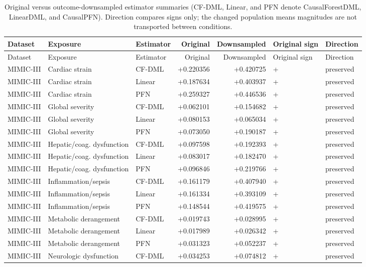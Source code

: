 \begin{longtable}{@{}p{0.78in}p{1.18in}p{0.56in}rrlp{0.62in}@{}}
\caption{Original versus outcome-downsampled estimator summaries (CF-DML, Linear, and PFN denote CausalForestDML, LinearDML, and CausalPFN). Direction compares signs only; the changed population means magnitudes are not transported between conditions.}\label{tab:supp-downsampling}\\
\toprule Dataset & Exposure & Estimator & Original & Downsampled & Original sign & Direction\\
\midrule \endfirsthead
\toprule Dataset & Exposure & Estimator & Original & Downsampled & Original sign & Direction\\
\midrule \endhead
MIMIC-III & Cardiac strain & CF-DML & +0.220356 & +0.420725 & + & preserved\\
MIMIC-III & Cardiac strain & Linear & +0.187634 & +0.403937 & + & preserved\\
MIMIC-III & Cardiac strain & PFN & +0.259327 & +0.446536 & + & preserved\\
MIMIC-III & Global severity & CF-DML & +0.062101 & +0.154682 & + & preserved\\
MIMIC-III & Global severity & Linear & +0.080153 & +0.065034 & + & preserved\\
MIMIC-III & Global severity & PFN & +0.073050 & +0.190187 & + & preserved\\
MIMIC-III & Hepatic/coag. dysfunction & CF-DML & +0.097598 & +0.192393 & + & preserved\\
MIMIC-III & Hepatic/coag. dysfunction & Linear & +0.083017 & +0.182470 & + & preserved\\
MIMIC-III & Hepatic/coag. dysfunction & PFN & +0.096846 & +0.219766 & + & preserved\\
MIMIC-III & Inflammation/sepsis & CF-DML & +0.161179 & +0.407940 & + & preserved\\
MIMIC-III & Inflammation/sepsis & Linear & +0.161334 & +0.393109 & + & preserved\\
MIMIC-III & Inflammation/sepsis & PFN & +0.148544 & +0.419575 & + & preserved\\
MIMIC-III & Metabolic derangement & CF-DML & +0.019743 & +0.028995 & + & preserved\\
MIMIC-III & Metabolic derangement & Linear & +0.017989 & +0.026342 & + & preserved\\
MIMIC-III & Metabolic derangement & PFN & +0.031323 & +0.052237 & + & preserved\\
MIMIC-III & Neurologic dysfunction & CF-DML & +0.034253 & +0.074812 & + & preserved\\

\end{longtable}
